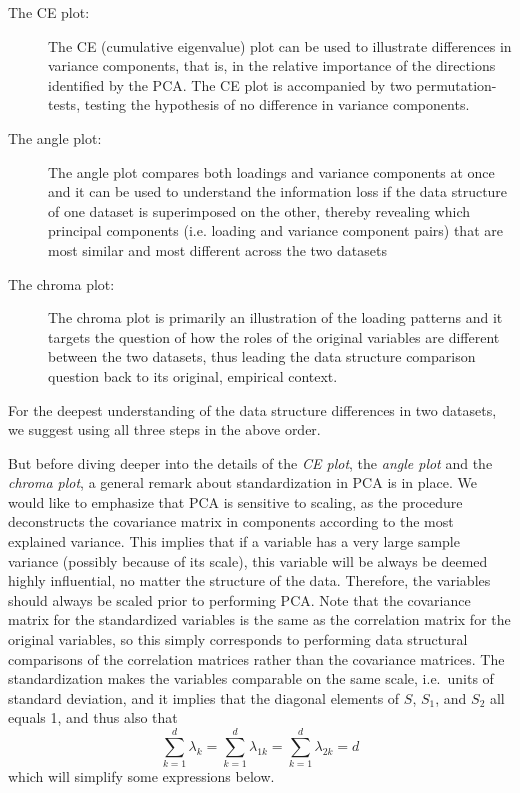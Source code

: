 \documentclass[titlepage,11pt,twoside]{article}
\begin{document}
\begin{description}
\item[The CE plot:] The CE (cumulative eigenvalue) plot can be used to illustrate differences in variance components, that is, in the relative importance of the directions identified by the PCA. The CE plot is accompanied by two permutation-tests, testing the hypothesis of no difference in variance components.
\item[The angle plot:] The angle plot compares both loadings and variance components at once and it can be used to understand the information loss if the data structure of one dataset is superimposed on the other, thereby revealing which principal components (i.e. loading and variance component pairs) that are most similar and most different across the two datasets
\item[The chroma plot:] The chroma plot is primarily an illustration of the loading patterns and it targets the question of how the roles of the original variables are different between the two datasets, thus leading the data structure comparison question back to its original, empirical context.
\end{description}
For the deepest understanding of the data structure differences in two datasets, we suggest using all three steps in the above order. 

But before diving deeper into the details of the \emph{CE plot}, the \emph{angle plot} and the \emph{chroma plot}, a general remark about standardization in PCA is in place. We would like to emphasize that PCA is sensitive to scaling, as the procedure deconstructs the covariance matrix in components according to the most explained variance. This implies that if a variable has a very large sample variance (possibly because of its scale), this variable will be always be deemed highly influential, no matter the structure of the data. Therefore, the variables should always be scaled prior to performing PCA. Note that the covariance matrix for the standardized variables is the same as the correlation matrix for the original variables, so this simply corresponds to performing data structural comparisons of the correlation matrices rather than the covariance matrices. The standardization makes the variables comparable on the same scale, i.e.\ units of standard deviation, and it implies that the diagonal elements of $S$, $S_1$, and $S_2$ all equals 1, and thus also that 
$$\sum_{k=1}^d \lambda_k = \sum_{k=1}^d \lambda_{1k} = \sum_{k=1}^d \lambda_{2k} =  d$$
which will simplify some expressions below. 
\end{document}
